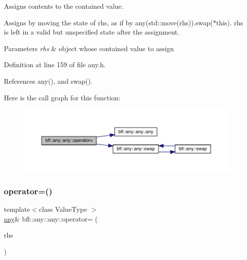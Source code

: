 Assigns contents to the contained value. 

Assigns by moving the state of rhs, as if by any(std\+::move(rhs)).swap($\ast$this). rhs is left in a valid but unspecified state after the assignment.


\begin{DoxyParams}{Parameters}
{\em rhs} & object whose contained value to assign \\
\hline
\end{DoxyParams}


Definition at line 159 of file any.\+h.



References any(), and swap().

Here is the call graph for this function\+:
\nopagebreak
\begin{figure}[H]
\begin{center}
\leavevmode
\includegraphics[width=350pt]{classbfl_1_1any_1_1any_a65609849a81b0af40e6b86751ae0350c_cgraph}
\end{center}
\end{figure}
\mbox{\label{classbfl_1_1any_1_1any_a62a6777ca18bd10bf05ffa0f6d131435}} 
\subsubsection{\texorpdfstring{operator=()}{operator=()}\hspace{0.1cm}{\footnotesize\ttfamily [3/3]}}
{\footnotesize\ttfamily template$<$class Value\+Type $>$ \\
\mbox{\hyperlink{classbfl_1_1any_1_1any}{any}}\& bfl\+::any\+::any\+::operator= (\begin{DoxyParamCaption}\item[{Value\+Type \&\&}]{rhs }\end{DoxyParamCaption})\hspace{0.3cm}{\ttfamily [inline]}}



